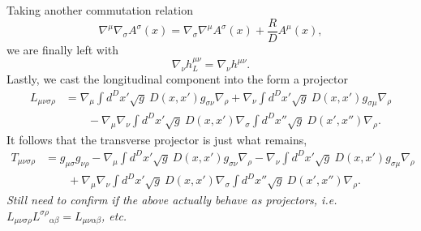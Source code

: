 \documentclass[10pt,letterpaper]{article}
\begin{document}
Taking another commutation relation
\begin{equation}
\nabla^\mu \nabla_\sigma A^\sigma(x) = \nabla_\sigma\nabla^\mu A^\sigma(x) + \frac{R}{D}A^\mu(x),
\end{equation}
we are finally left with
\begin{equation}
\nabla_\nu h^{\mu\nu}_L = \nabla_\nu h^{\mu\nu}.
\end{equation}
Lastly, we cast the longitudinal component into the form a projector
\begin{align}
L_{\mu\nu\sigma\rho} &= \nabla_\mu \int d^Dx' \sqrt g\ D(x,x') g_{\sigma\nu}\nabla_\rho 
+ \nabla_\nu \int d^Dx' \sqrt g\ D(x,x') g_{\sigma\mu}\nabla_\rho 
\nonumber\\
&\qquad - \nabla_\mu\nabla_\nu \int d^Dx'\sqrt{g}\  D(x,x') \nabla_\sigma \int d^Dx'' \sqrt{g}\ D(x',x'')\nabla_\rho. 
\end{align}
It follows that the transverse projector is just what remains,
\begin{align}
T_{\mu\nu\sigma\rho} &= g_{\mu\sigma}g_{\nu\rho}- \nabla_\mu \int d^Dx' \sqrt g\ D(x,x') g_{\sigma\nu}\nabla_\rho 
- \nabla_\nu \int d^Dx' \sqrt g\ D(x,x') g_{\sigma\mu}\nabla_\rho 
\nonumber\\
&\qquad + \nabla_\mu\nabla_\nu \int d^Dx'\sqrt{g}\  D(x,x') \nabla_\sigma \int d^Dx'' \sqrt{g}\ D(x',x'')\nabla_\rho. 
\end{align}
\emph{Still need to confirm if the above actually behave as projectors, i.e. $L_{\mu\nu\sigma\rho}L^{\sigma\rho}{}_{\alpha\beta} = L_{\mu\nu\alpha\beta}$, etc.}
\end{document}
